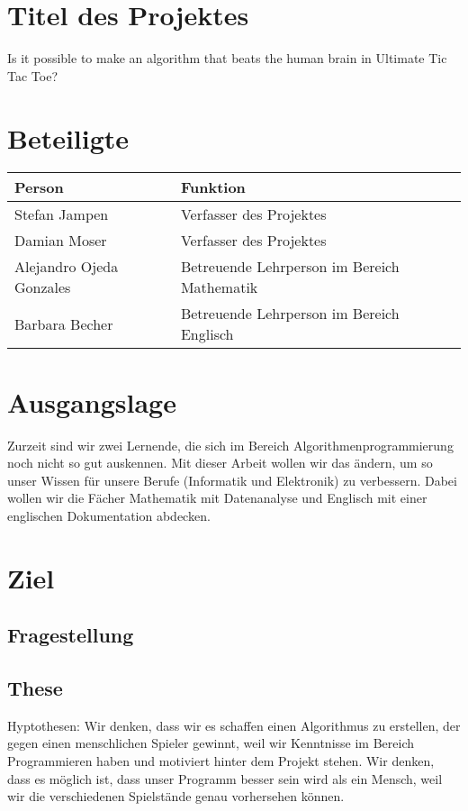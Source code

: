 \section{Titel des Projektes}
Is it possible to make an algorithm that beats the human brain in Ultimate Tic Tac Toe?

\section{Beteiligte}
\begin{tabularx}{\textwidth}{l|X}
\textbf{Person} & \textbf{Funktion} \\\hline
Stefan Jampen & Verfasser des Projektes \\
Damian Moser & Verfasser des Projektes \\
Alejandro Ojeda Gonzales & Betreuende Lehrperson im Bereich Mathematik \\
Barbara Becher & Betreuende Lehrperson im Bereich Englisch \\
\end{tabularx}

\section{Ausgangslage}
Zurzeit sind wir zwei Lernende, die sich im Bereich Algorithmenprogrammierung noch nicht so gut auskennen. Mit dieser Arbeit wollen wir das ändern, um so unser Wissen für unsere Berufe (Informatik und Elektronik) zu verbessern. Dabei wollen wir die Fächer Mathematik mit Datenanalyse und Englisch mit einer englischen Dokumentation abdecken.

\section{Ziel}

\subsection{Fragestellung}

\subsection{These}
Hyptothesen:
Wir denken, dass wir es schaffen einen Algorithmus zu erstellen, der gegen einen menschlichen Spieler gewinnt, weil wir Kenntnisse im Bereich Programmieren haben und motiviert hinter dem Projekt stehen.
Wir denken, dass es möglich ist, dass unser Programm besser sein wird als ein Mensch, weil wir die verschiedenen Spielstände genau vorhersehen können.

